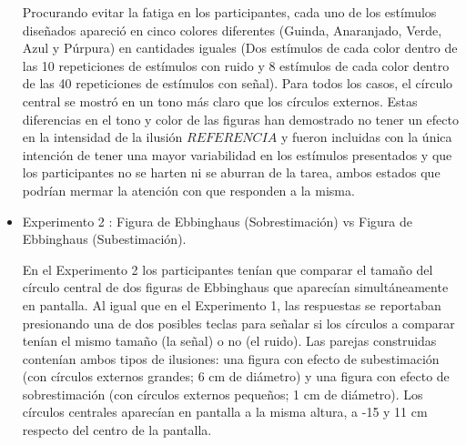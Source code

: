 \begin{itemize}
Procurando evitar la fatiga en los participantes, cada uno de los estímulos diseñados apareció en cinco colores diferentes (Guinda, Anaranjado, Verde, Azul y Púrpura) en cantidades iguales (Dos estímulos de cada color dentro de las 10 repeticiones de estímulos con ruido y 8 estímulos de cada color dentro de las 40 repeticiones de estímulos con señal). Para todos los casos, el círculo central se mostró en un tono más claro que los círculos externos. Estas diferencias en el tono y color de las figuras han demostrado no tener un efecto en la intensidad de la ilusión $REFERENCIA$ y fueron incluidas con la única intención de tener una mayor variabilidad en los estímulos presentados y que los participantes no se harten ni se aburran de la tarea, ambos estados que podrían mermar la atención con que responden a la misma. 

\item Experimento 2 : Figura de Ebbinghaus (Sobrestimación) vs Figura de Ebbinghaus (Subestimación).

En el Experimento 2 los participantes tenían que comparar el tamaño del círculo central de dos figuras de Ebbinghaus que aparecían simultáneamente en pantalla. Al igual que en el Experimento 1, las respuestas se reportaban presionando una de dos posibles teclas para señalar si los círculos a comparar tenían el mismo tamaño (la señal) o no (el ruido). Las parejas construidas contenían ambos tipos de ilusiones: una figura con efecto de subestimación (con círculos externos grandes; 6 cm de diámetro) y una figura con efecto de sobrestimación (con círculos externos pequeños; 1 cm de diámetro). Los círculos centrales aparecían en pantalla a la misma altura, a -15 y 11 cm respecto del centro de la pantalla.\\



\end{itemize}
